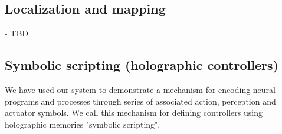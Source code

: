 \documentclass[conference]{IEEEtran}
\begin{document}
	

		\label{fig:visual-scene-exp}

	
	\subsection{Localization and mapping}
	- TBD
	
\subsection{Symbolic scripting (holographic controllers)}

We have used our system to demonstrate a mechanism for encoding neural programs and processes through series of associated action, perception and actuator symbols. We call this mechanism for defining controllers using holographic memories "symbolic scripting".
\end{document}
